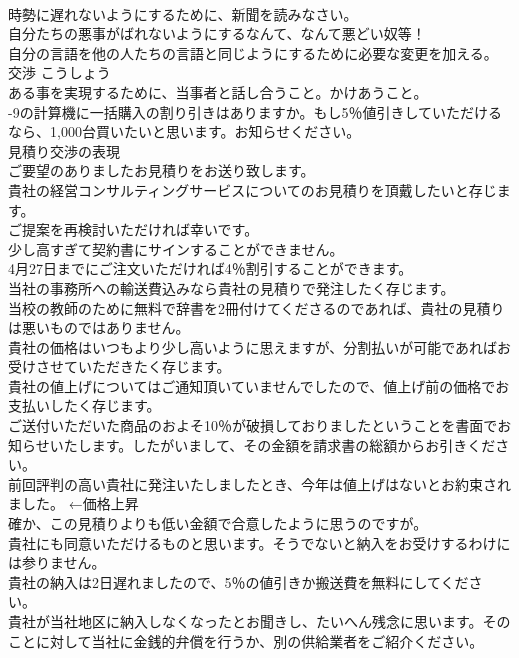 \documentclass[8pt]{extreport}
\begin{document}
\begin{CJK}{UTF8}{min}
\\	時勢に遅れないようにするために、新聞を読みなさい。   
\\	自分たちの悪事がばれないようにするなんて、なんて悪どい奴等！   
\\	自分の言語を他の人たちの言語と同じようにするために必要な変更を加える。   
\\	交渉	こうしょう	
\\	ある事を実現するために、当事者と話し合うこと。かけあうこと。	
\\	-9の計算機に一括購入の割り引きはありますか。もし5％値引きしていただけるなら、1,000台買いたいと思います。お知らせください。  
\\	見積り交渉の表現  
\\	ご要望のありましたお見積りをお送り致します。   
\\	貴社の経営コンサルティングサービスについてのお見積りを頂戴したいと存じます。   
\\	ご提案を再検討いただければ幸いです。   
\\	少し高すぎて契約書にサインすることができません。   
\\	4月27日までにご注文いただければ4％割引することができます。  
\\	当社の事務所への輸送費込みなら貴社の見積りで発注したく存じます。   
\\	当校の教師のために無料で辞書を2冊付けてくださるのであれば、貴社の見積りは悪いものではありません。   
\\	貴社の価格はいつもより少し高いように思えますが、分割払いが可能であればお受けさせていただきたく存じます。  
\\	貴社の値上げについてはご通知頂いていませんでしたので、値上げ前の価格でお支払いしたく存じます。   
\\	ご送付いただいた商品のおよそ10％が破損しておりましたということを書面でお知らせいたします。したがいまして、その金額を請求書の総額からお引きください。   
\\	前回評判の高い貴社に発注いたしましたとき、今年は値上げはないとお約束されました。 ←価格上昇  
\\	確か、この見積りよりも低い金額で合意したように思うのですが。  
\\	貴社にも同意いただけるものと思います。そうでないと納入をお受けするわけには参りません。   
\\	貴社の納入は2日遅れましたので、5％の値引きか搬送費を無料にしてください。  
\\	貴社が当社地区に納入しなくなったとお聞きし、たいへん残念に思います。そのことに対して当社に金銭的弁償を行うか、別の供給業者をご紹介ください。   

\end{CJK}
\end{document}
